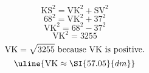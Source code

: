 \[\text{KS}^{2}=\text{VK}^{2}+\text{SV}^{2}\]
\[68^{2}=\text{VK}^{2}+37^{2}\]
\[\text{VK}^{2}=68^{2}-37^{2}\]
\[\text{VK}^{2}=3255\]
\[\text{VK}=\sqrt{\mathstrut 3255}\text{ because VK is positive.}\]
\[\uline{\text{VK}\approx\SI{57.05}{dm}}\]
